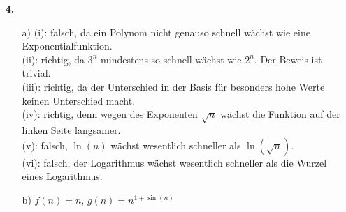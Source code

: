 \documentclass[a4paper,11pt]{article}
\begin{document}
\begin{enumerate}
            \item[\textbf{4.}]
                \begin{enumerate}
                    \item[a)]
                        (i): falsch, da ein Polynom nicht genauso schnell wächst
                        wie eine Exponentialfunktion.\\
                        (ii): richtig, da $3^n$ mindestens so schnell wächst wie
                        $2^n$. Der Beweis ist trivial.\\
                        (iii): richtig, da der Unterschied in der Basis für 
                        besonders hohe Werte keinen Unterschied macht.\\
                        (iv): richtig, denn wegen des Exponenten $\sqrt{n}$
                        wächst die Funktion auf der linken Seite langsamer.\\
                        (v): falsch, $\ln(n)$ wächst wesentlich schneller als
                        $\ln(\sqrt{n})$.\\
                        (vi): falsch, der Logarithmus wächst wesentlich
                        schneller als die Wurzel eines Logarithmus.
                    \item[b)]
                        $f(n)=n$, $g(n)=n^{1+\sin(n)}$
                \end{enumerate}

    \end{enumerate}
\end{document}
